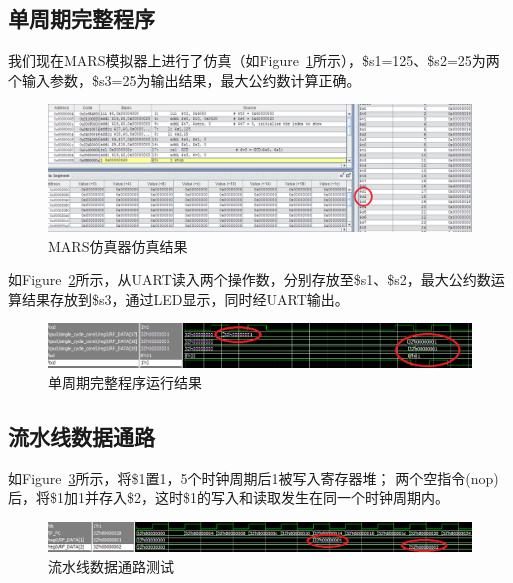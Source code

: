\documentclass{article}
\begin{document}
        \subsection{单周期完整程序}
            我们现在MARS模拟器上进行了仿真（如Figure~\ref{fig:singlecycle_full1}所示），\$s1=125、\$s2=25为两个输入参数，\$s3=25为输出结果，最大公约数计算正确。
            \begin{figure}[H]
                \centering
                \includegraphics[width=\textwidth]{images/singlecycle_full1.png}
                \caption{\label{fig:singlecycle_full1}MARS仿真器仿真结果}
            \end{figure}
            如Figure~\ref{fig:singlecycle_full2}所示，从UART读入两个操作数，分别存放至\$s1、\$s2，最大公约数运算结果存放到\$s3，通过LED显示，同时经UART输出。
            \begin{figure}[H]
                \centering
                \includegraphics[width=\textwidth]{images/singlecycle_full2.png}
                \caption{\label{fig:singlecycle_full2}单周期完整程序运行结果}
            \end{figure}

        \subsection{流水线数据通路}
            如Figure~\ref{fig:pipeline_datapathtest}所示，将\$1置1，5个时钟周期后1被写入寄存器堆；
            两个空指令(nop)后，将\$1加1并存入\$2，这时\$1的写入和读取发生在同一个时钟周期内。
            \begin{figure}[H]
                \centering
                \includegraphics[width=\textwidth]{images/pipeline_datapathtest.png}
                \caption{\label{fig:pipeline_datapathtest}流水线数据通路测试}
            \end{figure}
\end{document}
